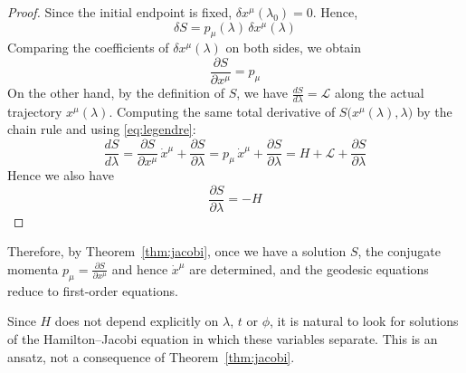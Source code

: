 \documentclass{article}
\theoremstyle{remark}
\begin{document}
\begin{proof}
    Since the initial endpoint is fixed, \(\delta x^\mu(\lambda_0) = 0\). Hence,
    \begin{equation}
        \delta S 
        = p_\mu(\lambda)\,\delta x^\mu(\lambda)
            \end{equation}
    Comparing the coefficients of \(\delta x^\mu(\lambda)\) on both sides, 
    we obtain
    \begin{equation}
        \frac{\partial S}{\partial x^\mu} 
        = p_\mu
    \end{equation}
    On the other hand, by the definition of $S$, we have $\frac{dS}{d\lambda} = \mathcal{L}$ along the actual trajectory \(x^\mu(\lambda)\). Computing the same total derivative of \(S\bigl(x^\mu(\lambda), \lambda\bigr)\) by the chain rule and using \eqref{eq:legendre}:
    \begin{equation}
        \frac{dS}{d\lambda}
        = \frac{\partial S}{\partial x^\mu}\,\dot{x}^\mu
          + \frac{\partial S}{\partial \lambda}
        = p_\mu \,\dot{x}^\mu
          + \frac{\partial S}{\partial \lambda}
          = H+\mathcal{L}+ \frac{\partial S}{\partial \lambda}
    \end{equation}
    Hence we also have 
    \begin{equation}
        \frac{\partial S}{\partial \lambda} = -H
    \end{equation}
\end{proof}
Therefore, by Theorem~\ref{thm:jacobi}, once we have a solution $S$, the conjugate momenta $p_{\mu}=\frac{\partial S}{\partial x^{\mu}}$ and hence $\dot{x}^{\mu}$ are determined, and the geodesic equations reduce to first-order equations.

Since $H$ does not depend explicitly on $\lambda$, $t$ or $\phi$, it is natural to look for solutions of the Hamilton--Jacobi equation in which these variables separate. This is an ansatz, not a consequence of Theorem~\ref{thm:jacobi}.
\end{document}
